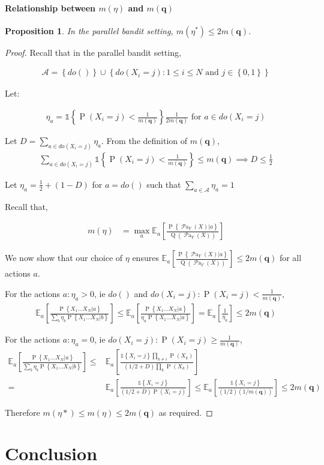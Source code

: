\documentclass[11pt,a4paper,oneside]{book}
\newcommand{\Q}[1]{\operatorname{Q}\left(#1\right)}
\newcommand{\EE}{\mathbb E}
\newcommand{\EEa}{\EE_a}
\newcommand{\Pn}[2]{\operatorname{P}\left\{#2|#1\right\}}
\newcommand{\calA}{\mathcal A}
\newcommand{\set}[1]{\left\{#1\right\}}
\newcommand{\ind}[1]{\mathds{1}\!\!\set{#1}}
\newcommand{\eq}[1]{\begin{align*}#1\end{align*}}
\renewcommand{\P}[1]{\operatorname{P}\left(#1\right)}
\newcommand{\parents}[1]{\operatorname{\mathcal{P}a}_{#1}}
\theoremstyle{plain}
\newtheorem{proposition}[theorem]{Proposition}
\theoremstyle{definition}
\begin{document}
\subsubsection{Relationship between $m(\eta)$ and $m(\boldsymbol{q})$}\label{sec:m-equivelence}

\begin{proposition} In the parallel bandit setting,
$m(\eta^*) \leq 2m(\boldsymbol{q})$.
\end{proposition} 

\begin{proof}

Recall that in the parallel bandit setting,

\eq{
\mathcal{A} = \set{do()} \cup \set{ do(X_i = j) \colon 1 \leq i \leq N \text{ and } j \in \set{0,1}}
}

Let:

\eq {
\eta_a = \ind{\P{X_i = j} < \frac{1}{m(\boldsymbol{q})}}\frac{1}{2m(\boldsymbol{q})} \text { for } a \in do(X_i = j)
}

Let $D =\sum_{a\in do(X_i=j)}\eta_a$. From the definition of $m(\boldsymbol{q})$, 
\eq {
\sum_{a\in do(X_i=j)} \ind{\P{X_i = j} < \frac{1}{m(\boldsymbol{q})}} \leq m(\boldsymbol{q}) \implies D \leq \frac{1}{2}
}
 
Let $\eta_a = \frac{1}{2} + (1-D)$ for $a = do()$ such that $\sum_{a \in \calA}\eta_a = 1$ 

Recall that,

\eq{
m(\eta) &
= \max_a \EEa\left[\frac{\Pn{a}{\parents{Y}(X)}}{\Q{\parents{Y}(X)}}\right]
}

We now show that our choice of $\eta$ ensures $\EEa\left[\frac{\Pn{a}{\parents{Y}(X)}}{\Q{\parents{Y}(X)}}\right] \leq 2m(\boldsymbol{q})$ for all actions $a$.

For the actions $a: \eta_a > 0$, ie $do()$ and $do(X_i = j):\P{X_i=j}<\frac{1}{m(\boldsymbol{q})}$,
\eq{
\EEa\left[\frac{\Pn{a}{X_1...X_N}}{\sum_{b}\eta_b\Pn{b}{X_1...X_N}}\right] \leq \EEa\left[\frac{\Pn{a}{X_1...X_N}}{\eta_a\Pn{a}{X_1...X_N}}\right] = \EEa\left[\frac{1}{\eta_a}\right] \leq 2m(\boldsymbol{q})
}

For the actions $a :\eta_a = 0$, ie $do(X_i=j):\P{X_i=j}\geq\frac{1}{m(\boldsymbol{q})}$,
\eq{
\EEa\left[\frac{\Pn{a}{X_1...X_N}}{\sum_{b}\eta_b\Pn{b}{X_1...X_N}}\right] \leq & \EEa\left[\frac{\ind{X_i=j}\prod_{k\neq i}\P{X_k}}{(1/2+D)\prod_k \P{X_k}}\right] \\=& \EEa\left[\frac{\ind{X_i=j}}{(1/2+D)\P{X_i = j}}\right]
\leq  \EEa\left[\frac{\ind{X_i=j}}{(1/2)(1/m(\boldsymbol{q}))}\right] \leq 2m(\boldsymbol{q})
}

Therefore $m(\eta*) \leq m(\eta) \leq 2m(\boldsymbol{q})$ as required.

\end{proof}




\chapter{Conclusion}













\end{document}
